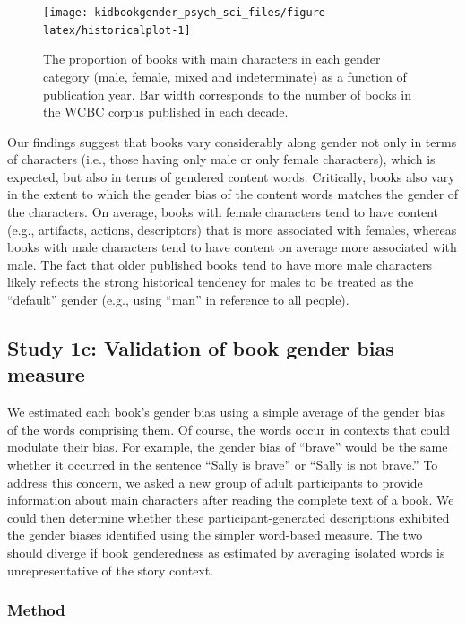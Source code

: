 \documentclass[
  english,
  ,man,floatsintext]{apa6}
\begin{document}
\begin{figure}[t!]
\texttt{[image: kidbookgender\_psych\_sci\_files/figure-latex/historicalplot-1]} \caption{The proportion of books with main characters in each gender category (male, female, mixed and indeterminate) as a function of publication year. Bar width corresponds to the number of books in the WCBC corpus published in each decade.}\label{fig:historicalplot}
\end{figure}

Our findings suggest that books vary considerably along gender not only in terms of characters (i.e., those having only male or only female characters), which is expected, but also in terms of gendered content words. Critically, books also vary in the extent to which the gender bias of the content words matches the gender of the characters. On average, books with female characters tend to have content (e.g., artifacts, actions, descriptors) that is more associated with females, whereas books with male characters tend to have content on average more associated with male. The fact that older published books tend to have more male characters likely reflects the strong historical tendency for males to be treated as the ``default'' gender (e.g., using ``man'' in reference to all people).

\hypertarget{study-1c-validation-of-book-gender-bias-measure}{%
\subsection{Study 1c: Validation of book gender bias measure}\label{study-1c-validation-of-book-gender-bias-measure}}

We estimated each book's gender bias using a simple average of the gender bias of the words comprising them. Of course, the words occur in contexts that could modulate their bias. For example, the gender bias of ``brave'' would be the same whether it occurred in the sentence ``Sally is brave'' or ``Sally is not brave.'' To address this concern, we asked a new group of adult participants to provide information about main characters after reading the complete text of a book. We could then determine whether these participant-generated descriptions exhibited the gender biases identified using the simpler word-based measure. The two should diverge if book genderedness as estimated by averaging isolated words is unrepresentative of the story context.

\hypertarget{method-2}{%
\subsubsection{Method}\label{method-2}}
\end{document}
